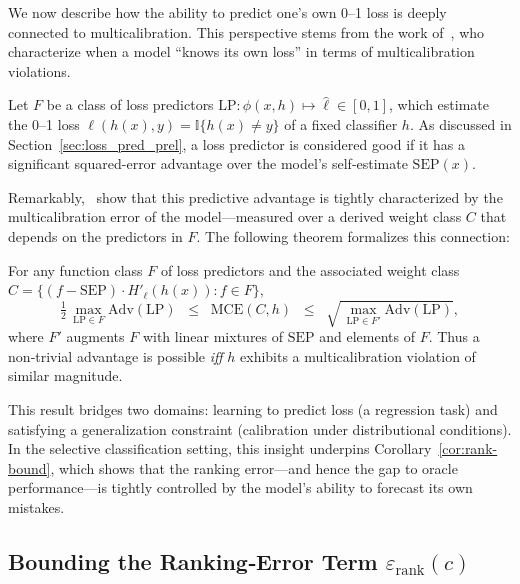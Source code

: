 We now describe how the ability to predict one’s own 0--1 loss is deeply connected to multicalibration. This perspective stems from the work of~\citet{gollakota2025loss}, who characterize when a model “knows its own loss” in terms of multicalibration violations. 

Let \(F\) be a class of loss predictors \(\mathrm{LP} \colon \phi(x,h) \mapsto \hat{\ell} \in [0,1]\), which estimate the 0--1 loss \(\ell(h(x),y) = \mathbb{I}\{h(x) \ne y\}\) of a fixed classifier \(h\). As discussed in Section~\ref{sec:loss_pred_prel}, a loss predictor is considered good if it has a significant squared-error advantage over the model’s self-estimate \(\mathrm{SEP}(x)\).

Remarkably,~\citet{gollakota2025loss} show that this predictive advantage is tightly characterized by the multicalibration error of the model—measured over a derived weight class \(C\) that depends on the predictors in \(F\). The following theorem formalizes this connection:

\begin{theorem}
\label{thm:loss-mcal}
For any function class \(F\) of loss predictors and the associated
weight class \(C=\{(f-\mathrm{SEP})\cdot H'_{\ell}(h(x)) : f\in F\}\),
\begin{equation}
\tfrac12\,
\max_{\mathrm{LP}\in F}\mathrm{Adv}(\mathrm{LP})
\;\;\le\;\;
\mathrm{MCE}(C,h)
\;\;\le\;\;
\sqrt{\,
\max_{\mathrm{LP}\in F'}\mathrm{Adv}(\mathrm{LP})
},
\end{equation}
where \(F'\) augments \(F\) with linear mixtures of \(\mathrm{SEP}\) and
elements of \(F\).  Thus a non‑trivial advantage is possible
\emph{iff} \(h\) exhibits a multicalibration violation of similar
magnitude.
\end{theorem}

This result bridges two domains: learning to predict loss (a regression task) and satisfying a generalization constraint (calibration under distributional conditions). In the selective classification setting, this insight underpins Corollary~\ref{cor:rank-bound}, which shows that the ranking error—and hence the gap to oracle performance—is tightly controlled by the model’s ability to forecast its own mistakes.



\subsection{Bounding the Ranking‑Error Term \(\varepsilon_{\text{rank}}(c)\)}

